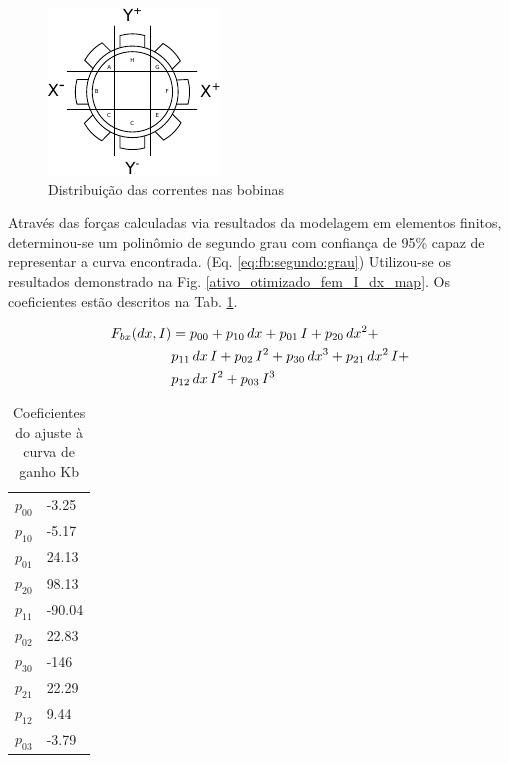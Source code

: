 \begin{figure}[th]
\centering
\includegraphics[width=0.7\linewidth]{./Figs/Modelagem/ativo-atuadores-conexao}
\caption{Distribuição das correntes nas bobinas}
\label{fig:blocos:tensao:bobinas:x:y}
\end{figure}

Através das forças calculadas via resultados da modelagem em elementos finitos, determinou-se um polinômio de segundo grau com confiança de 95\% capaz de representar a curva encontrada.
(Eq. \ref{eq:fb:segundo:grau}) Utilizou-se os resultados demonstrado na Fig.
\ref{ativo_otimizado_fem_I_dx_map}. Os coeficientes estão descritos na Tab. \ref{tab:dinamico:ajuste:kb}.

\begin{align}
     F_{bx}(dx,I) &= p_{00} + p_{10} \, dx + p_{01} \, I + p_{20} \, dx^2 + \notag\\
     & p_{11} \, dx \, I + p_{02} \, I^2 + p_{30} \, dx^3 + p_{21} \, dx^2 \, I + \notag \\
     & p_{12} \, dx \, I^2 + p_{03} \, I^3
     \label{eq:fb:segundo:grau}
\end{align}

\begin{table}[ht!]
\centering
\begin{tabular}{c l}
	   $p_{00}$ & -3.25\\
	   $p_{10}$ & -5.17\\
	   $p_{01}$ & 24.13\\
	   $p_{20}$ & 98.13\\
	   $p_{11}$ & -90.04\\
	   $p_{02}$ & 22.83\\
	   $p_{30}$ & -146\\
	   $p_{21}$ & 22.29\\
	   $p_{12}$ & 9.44	\\
	   $p_{03}$ & -3.79
\end{tabular} 
\caption{Coeficientes do ajuste à curva de ganho Kb}
\label{tab:dinamico:ajuste:kb}
\end{table}

